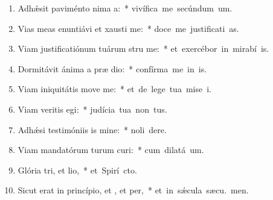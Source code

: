 \begin{flushleft}
\begin{enumerate}[leftmargin=*]

\item Adh\'{\ae}sit paviménto nima a:~* \mbox{vivífica me secúndum  um.}
\item Vias meas enuntiávi et xausti me:~* \mbox{doce me justificati as.}
\item Viam justificatiónum tuárum stru me:~* \mbox{et exercébor in mirabí is.}
\item Dormitávit ánima a præ dio:~* \mbox{confírma me in  is.}
\item Viam iniquitátis move  me:~* \mbox{et de lege tua mise i.}
\item Viam veritis egi:~* \mbox{judícia tua non  tus.}
\item Adh\'{\ae}si testimóniis is mine:~* \mbox{noli  dere.}
\item Viam mandatórum turum curi:~* \mbox{cum dilatá  um.}
\item Glória tri, et lio,~* \mbox{et Spirí cto.}
\item Sicut erat in princípio, et , et per,~* \mbox{et in s\'{\ae}cula sæcu. men.}


\end{enumerate}
\end{flushleft}

